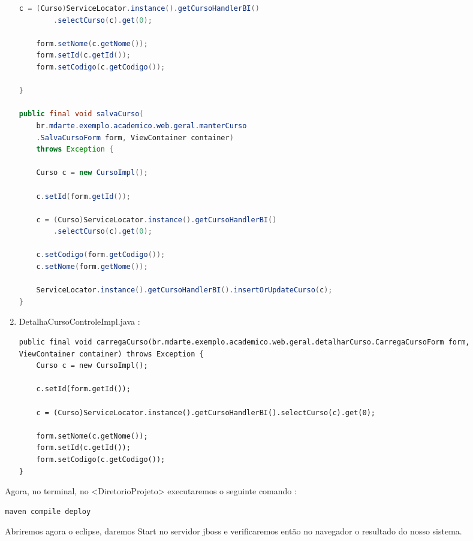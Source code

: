 \begin{enumerate}
\begin{lstlisting}[language=java]
   	c = (Curso)ServiceLocator.instance().getCursoHandlerBI()
   		.selectCurso(c).get(0);
    	
   	form.setNome(c.getNome());
   	form.setId(c.getId());
   	form.setCodigo(c.getCodigo());
    	
}

public final void salvaCurso(
	br.mdarte.exemplo.academico.web.geral.manterCurso
	.SalvaCursoForm form, ViewContainer container)
	throws Exception {

   	Curso c = new CursoImpl();
    	
   	c.setId(form.getId());
    	
   	c = (Curso)ServiceLocator.instance().getCursoHandlerBI()
   		.selectCurso(c).get(0);
    	
	c.setCodigo(form.getCodigo()); 
	c.setNome(form.getNome());

	ServiceLocator.instance().getCursoHandlerBI().insertOrUpdateCurso(c);
}
\end{lstlisting}

\item DetalhaCursoControleImpl.java :
\begin{lstlisting}
public final void carregaCurso(br.mdarte.exemplo.academico.web.geral.detalharCurso.CarregaCursoForm form, ViewContainer container) throws Exception {
	Curso c = new CursoImpl();
    	
    c.setId(form.getId());
    	
    c = (Curso)ServiceLocator.instance().getCursoHandlerBI().selectCurso(c).get(0);

    form.setNome(c.getNome());
    form.setId(c.getId());
    form.setCodigo(c.getCodigo());	
}
\end{lstlisting}
\end{enumerate}

Agora, no terminal, no <DiretorioProjeto> executaremos o seguinte comando :

\begin{lstlisting}[language=bash]
maven compile deploy
\end{lstlisting}

Abriremos agora o eclipse, daremos Start no servidor jboss e verificaremos então no navegador o resultado do nosso sistema.